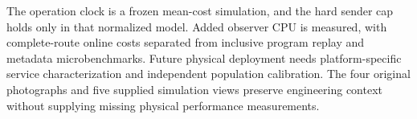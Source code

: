 The operation clock is a frozen mean-cost simulation, and the hard sender cap holds only in that normalized model. Added observer CPU is measured, with complete-route online costs separated from inclusive program replay and metadata microbenchmarks. Future physical deployment needs platform-specific service characterization and independent population calibration. The four original photographs and five supplied simulation views preserve engineering context without supplying missing physical performance measurements.
